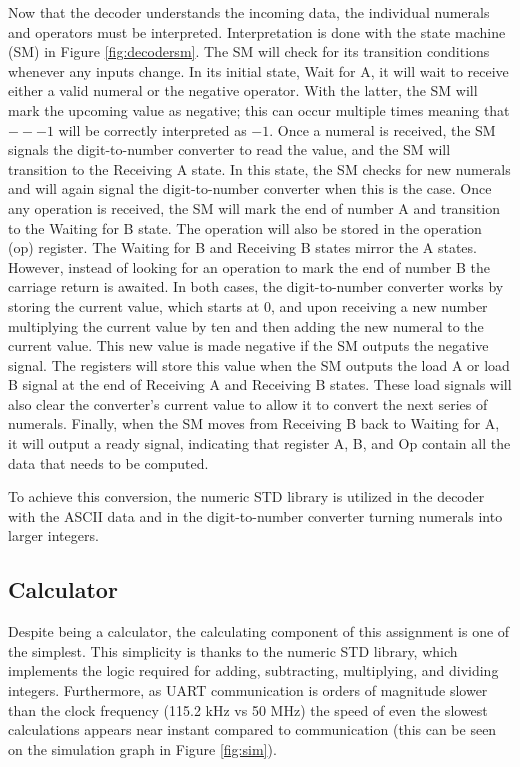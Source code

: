 \documentclass[11pt]{article}
\begin{document}
Now that the decoder understands the incoming data, the individual numerals and operators must be interpreted.
Interpretation is done with the state machine (SM) in Figure \ref{fig:decodersm}.
The SM will check for its transition conditions whenever any inputs change. 
In its initial state, Wait for A, it will wait to receive either a valid numeral or the negative operator. 
With the latter, the SM will mark the upcoming value as negative; this can occur multiple times meaning that $---1$ will be correctly interpreted as $-1$.
Once a numeral is received, the SM signals the digit-to-number converter to read the value, and the SM will transition to the Receiving A state. 
In this state, the SM checks for new numerals and will again signal the digit-to-number converter when this is the case.
Once any operation is received, the SM will mark the end of number A and transition to the Waiting for B state.
The operation will also be stored in the operation (op) register.
The Waiting for B and Receiving B states mirror the A states.
However, instead of looking for an operation to mark the end of number B the carriage return is awaited.
In both cases, the digit-to-number converter works by storing the current value, which starts at 0, and upon receiving a new number multiplying the current value by ten and then adding the new numeral to the current value.
This new value is made negative if the SM outputs the negative signal.
The registers will store this value when the SM outputs the load A or load B signal at the end of Receiving A and Receiving B states.
These load signals will also clear the converter's current value to allow it to convert the next series of numerals.
Finally, when the SM moves from Receiving B back to Waiting for A, it will output a ready signal, indicating that register A, B, and Op contain all the data that needs to be computed.

To achieve this conversion, the numeric STD library is utilized in the decoder with the ASCII data and in the digit-to-number converter turning numerals into larger integers.

\subsection{Calculator}
Despite being a calculator, the calculating component of this assignment is one of the simplest.
This simplicity is thanks to the numeric STD library, which implements the logic required for adding, subtracting, multiplying, and dividing integers.
Furthermore, as UART communication is orders of magnitude slower than the clock frequency (115.2 kHz vs 50 MHz)
the speed of even the slowest calculations appears near instant compared to communication (this can be seen on the simulation graph in Figure \ref{fig:sim}).
\end{document}
